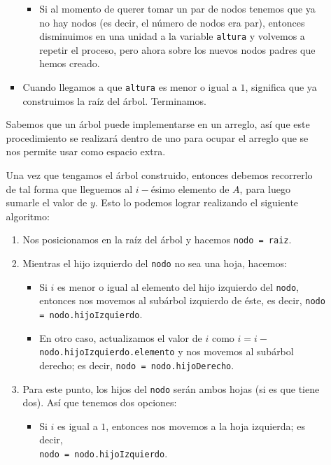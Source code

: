 \documentclass[letterpaper,11pt]{article}
\begin{document}
\begin{enumerate}
\begin{itemize}
\begin{itemize}
\begin{itemize}
                \item Si al momento de querer tomar un par de nodos tenemos 
                que ya no hay nodos (es decir, el número de nodos era par), 
                entonces disminuimos en una unidad a la variable \texttt{altura}
                y volvemos a repetir el proceso, pero ahora sobre los nuevos 
                nodos padres que hemos creado. 
            \end{itemize}

            \item Cuando llegamos a que \texttt{altura} es menor o igual a $1$, 
            significa que ya construimos la raíz del árbol. Terminamos.
        \end{itemize}

        Sabemos que un árbol puede implementarse en un arreglo, así que este 
        procedimiento se realizará dentro de uno para ocupar el arreglo que se 
        nos permite usar como espacio extra. 
        
        Una vez que tengamos el árbol construido, entonces debemos recorrerlo de 
        tal forma que lleguemos al $i-$ésimo elemento de $A$, para luego sumarle 
        el valor de $y$. Esto lo podemos lograr realizando el siguiente 
        algoritmo:
        \begin{enumerate}
            \item Nos posicionamos en la raíz del árbol y hacemos 
            \texttt{nodo = raiz}. 

            \item Mientras el hijo izquierdo del \texttt{nodo} no sea una 
            hoja, hacemos:
            \begin{itemize}
                \item Si $i$ es menor o igual al elemento del hijo izquierdo 
                del \texttt{nodo}, entonces nos movemos al subárbol izquierdo 
                de éste, es decir, \texttt{nodo = nodo.hijoIzquierdo}.

                \item En otro caso, actualizamos el valor de $i$ como 
                $i = i -$ \texttt{nodo.hijoIzquierdo.elemento} y nos movemos 
                al subárbol derecho; es decir, \texttt{nodo = nodo.hijoDerecho}.
            \end{itemize}

            \item Para este punto, los hijos del \texttt{nodo} serán ambos 
            hojas (si es que tiene dos). Así que tenemos dos opciones:
            \begin{itemize}
                \item Si $i$ es igual a $1$, entonces nos movemos a la 
                hoja izquierda; es decir, \\ 
                \texttt{nodo = nodo.hijoIzquierdo}.


\end{itemize}
\end{enumerate}
\end{itemize}
\end{enumerate}
\end{document}
